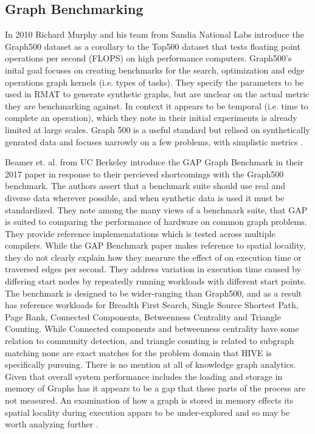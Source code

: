 \documentclass[sigconf,authordraft]{acmart}
\begin{document}
\subsection{Graph Benchmarking}

\par{In 2010 Richard Murphy and his team from Sandia National Labs introduce the Graph500 dataset as a corollary to the Top500 dataset that tests floating point operations per second (FLOPS) on high performance computers. 
Graph500's inital goal focuses on creating benchmarks for the search, optimization and edge operations graph kernels (i.e. types of tasks).
They specify the parameters to be used in RMAT to generate synthetic graphs, but are unclear on the actual metric they are benchmarking against. 
In context it appears to be temporal (i.e. time to complete an operation), which they note in their initial experiments is already limited at large scales. 
Graph 500 is a useful standard but relised on synthetically genrated data and focuses narrowly on a few problems, with simplistic metrics \cite{Murphy2010}.}

\par{Beamer et. al. from UC Berkeley introduce the GAP Graph Benchmark in their 2017 paper in response to their percieved shortcomings with the Graph500 benchmark. 
The authors assert that a benchmark suite should use real and diverse data wherever possible, and when synthetic data is used it must be standardized. 
They note among the many views of a benchmark suite, that GAP is suited to comparing the performance of hardware on common graph problems.
They provide reference implemenatations which is tested across multiple compilers. 
While the GAP Benchmark paper makes reference to spatial locaility, they do not clearly explain how they mearure the effect of on execution time or traversed edges per second. 
They address variation in execution time caused by differing start nodes by repeatedly running workloads with different start points. 
The benchmark is designed to be wider-ranging than Graph500, and as a result has reference workloads for Breadth First Search, Single Source Shortest Path, Page Rank, Connected Components, Betweenness Centrality and Triangle Counting. 
While Connected components and betweenness centrality have some relation to community detection, and triangle counting is related to subgraph matching none are exact matches for the problem domain that HIVE is specifically pursuing. 
There is no mention at all of knowledge graph analytics. Given that overall system performance includes the loading and storage in memory of Graphs has it appears to be a gap that these parts of the process are not measured. 
An examination of how a graph is stored in memory effects its spatial locality during execution appars to be under-explored and so may be worth analyzing further \cite{Beamer2017}.}
\end{document}
